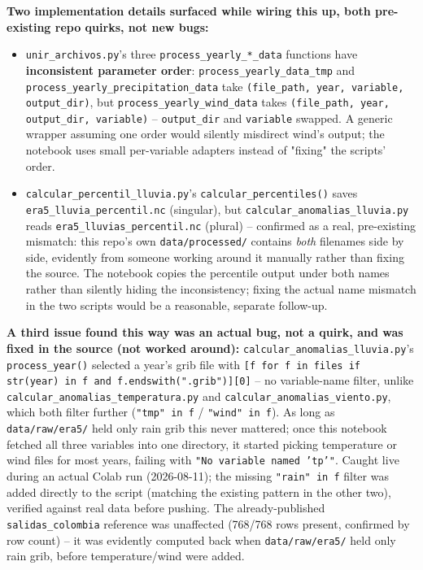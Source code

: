 \documentclass[11pt]{article}
\begin{document}
\textbf{Two implementation details surfaced while wiring this up, both
pre-existing repo quirks, not new bugs:}
\begin{itemize}[leftmargin=*]
\item \texttt{unir\_archivos.py}'s three \texttt{process\_yearly\_*\_data}
  functions have \textbf{inconsistent parameter order}:
  \texttt{process\_yearly\_data\_tmp} and
  \texttt{process\_yearly\_precipitation\_data} take
  \texttt{(file\_path, year, variable, output\_dir)}, but
  \texttt{process\_yearly\_wind\_data} takes
  \texttt{(file\_path, year, output\_dir, variable)} -- \texttt{output\_dir}
  and \texttt{variable} swapped. A generic wrapper assuming one order
  would silently misdirect wind's output; the notebook uses small
  per-variable adapters instead of "fixing" the scripts' order.
\item \texttt{calcular\_percentil\_lluvia.py}'s \texttt{calcular\_percentiles()}
  saves \texttt{era5\_lluvia\_percentil.nc} (singular), but
  \texttt{calcular\_anomalias\_lluvia.py} reads
  \texttt{era5\_lluvias\_percentil.nc} (plural) -- confirmed as a real,
  pre-existing mismatch: this repo's own \texttt{data/processed/}
  contains \emph{both} filenames side by side, evidently from someone
  working around it manually rather than fixing the source. The notebook
  copies the percentile output under both names rather than silently
  hiding the inconsistency; fixing the actual name mismatch in the two
  scripts would be a reasonable, separate follow-up.
\end{itemize}

\textbf{A third issue found this way was an actual bug, not a quirk, and
was fixed in the source (not worked around):}
\texttt{calcular\_anomalias\_lluvia.py}'s \texttt{process\_year()} selected
a year's grib file with \texttt{[f for f in files if str(year) in f and
f.endswith(".grib")][0]} -- no variable-name filter, unlike
\texttt{calcular\_anomalias\_temperatura.py} and
\texttt{calcular\_anomalias\_viento.py}, which both filter further
(\texttt{"tmp" in f} / \texttt{"wind" in f}). As long as
\texttt{data/raw/era5/} held only rain grib this never mattered; once this
notebook fetched all three variables into one directory, it started
picking temperature or wind files for most years, failing with
\texttt{"No variable named 'tp'"}. Caught live during an actual Colab run
(2026-08-11); the missing \texttt{"rain" in f} filter was added directly
to the script (matching the existing pattern in the other two), verified
against real data before pushing. The already-published
\texttt{salidas\_colombia} reference was unaffected (768/768 rows present,
confirmed by row count) -- it was evidently computed back when
\texttt{data/raw/era5/} held only rain grib, before temperature/wind were
added.
\end{document}
